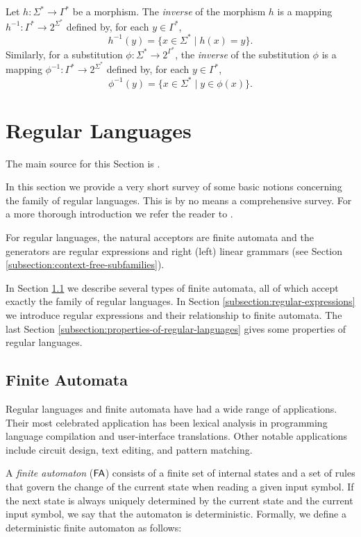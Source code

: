 Let $h: \Sigma^* \to \Gamma^*$ be a morphism. The  \emph{inverse} of the morphism $h$ is a mapping $h^{-1}: \Gamma^* \to 2^{\Sigma^*}$ defined by, for each $y \in \Gamma^*$,
$$h^{-1}(y) = \{x \in \Sigma^* \mid h(x) = y\}.$$
Similarly, for a substitution $\phi: \Sigma^* \to 2^{\Gamma^*}$, the \emph{inverse} of the substitution $\phi$ is a mapping $\phi^{-1}: \Gamma^* \to 2^{\Sigma^*}$ defined by, for each $y \in \Gamma^*$,
$$\phi^{-1}(y) = \{x \in \Sigma^* \mid y \in \phi(x)\}.$$

\section{Regular Languages}
\label{section:regular-languages}

The main source for this Section is \citep{Sh1997regular}.

In this section we provide a very short survey of some basic notions concerning the family of regular languages. This is by no means a comprehensive survey. For a more thorough introduction we refer the reader to \citep{HopcroftMotwaniUllman07}.

For regular languages, the natural acceptors are finite automata and the generators are regular expressions and right (left) linear grammars (see Section \ref{subsection:context-free-subfamilies}).

In Section \ref{subsection:finite-automata} we describe several types of finite automata, all of which accept exactly the family of regular languages. In Section \ref{subsection:regular-expressions} we introduce regular expressions and their relationship to finite automata. The last Section \ref{subsection:properties-of-regular-languages} gives some properties of regular languages.

\subsection{Finite Automata}
\label{subsection:finite-automata}

Regular languages and finite automata have had a wide range of applications. Their most celebrated application has been lexical analysis in programming language compilation and user-interface translations. Other notable applications include circuit design, text editing, and pattern matching.

A \emph{finite automaton} \index{$\FA$}($\FA$) consists of a finite set of internal states and a set of rules that govern the change of the current state when reading a given input symbol. If the next state is always uniquely determined by the current state and the current input symbol, we say that the automaton is deterministic. Formally, we define a deterministic finite automaton as follows:


